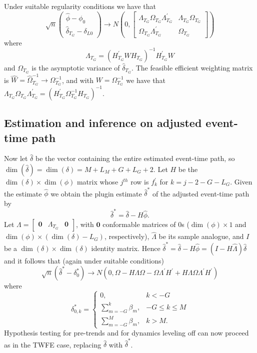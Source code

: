 \documentclass[bib]{./sty/statapress}
\begin{document}
Under suitable regularity conditions we have that
\[
\sqrt{n}\left(\begin{array}{c}
\widehat{\phi}-\phi_{0}\\
\widehat{\delta}_{T_G}-\delta_{L0}
\end{array}\right)\to N\left(0,\begin{bmatrix}\Lambda_{T_G}\Omega_{T_G}\Lambda_{T_G}^{\prime} & \Lambda_{T_G}\Omega_{T_G}\\
\Omega_{T_G}\Lambda_{T_G}^{\prime} & \Omega_{T_G}
\end{bmatrix}\right)
\]
where
\[
\Lambda_{T_G}=(H_{T_G}^{\prime}WH_{T_G})^{-1}H_{T_G}^{\prime}W
\]
and $\Omega_{T_G}$ is the asymptotic variance of $\widehat{\delta}_{T_G}$.
The feasible efficient weighting matrix is $\widehat{W}=\widehat{\Omega}_{T_G}^{-1}\to\Omega_{T_G}^{-1}$,
and with $W=\Omega_{T_G}^{-1}$ we have that $\Lambda_{T_G}\Omega_{T_G}\Lambda_{T_G}^{\prime}=(H_{T_G}^{\prime}\Omega_{T_G}^{-1}H_{T_G})^{-1}.$

\subsection{Estimation and inference on adjusted event-time path}

Now let $\hat{\delta}$ be the vector containing the entire estimated
event-time path, so $\dim\left(\hat{\delta}\right)=\dim\left(\delta\right)=M+L_{M}+G+L_{G}+2$.
Let $H$ be the $\dim\left(\delta\right)\times\dim\left(\phi\right)$
matrix whose $j^{th}$ row is $f_{k}^{'}$ for $k=j-2-G-L_{G}$. Given
the estimate $\widehat{\phi}$ we obtain the plugin estimate $\hat{\delta}^{*}$
of the adjusted event-time path by
\[
\hat{\delta}^{*}=\widehat{\delta}-H\hat{\phi}.
\]
Let $\Lambda=\begin{bmatrix}\boldsymbol{0} & \Lambda_{T_G} & \boldsymbol{0}\end{bmatrix}$,
with $\boldsymbol{0}$ conformable matrices of 0s ($\dim\left(\phi\right)\times1$
and $\dim\left(\phi\right)\times\left(\dim\left(\delta\right)-L_{G}\right)$,
respectively), $\widehat{\Lambda}$ be its sample analogue, and $I$
be a $\dim\left(\delta\right)\times\dim\left(\delta\right)$ identity
matrix. Hence $\hat{\delta}^{*}=\widehat{\delta}-H\hat{\phi}=\left(I-H\widehat{\Lambda}\right)\widehat{\delta}$
and it follows that (again under suitable conditions)
\[
\sqrt{n}\left(\widehat{\delta}^{*}-\delta_{0}^{*}\right)\to N\left(0,\Omega-H\Lambda\Omega-\Omega\Lambda^{\prime}H^{\prime}+H\Lambda\Omega\Lambda^{\prime}H^{\prime}\right)
\]
where
\[
\delta_{0,k}^{*}=\begin{cases}
0, & k<-G\\
\sum_{m=-G}^{k}\beta_{m}, & -G\le k\le M\\
\sum_{m=-G}^{M}\beta_{m}, & k>M.
\end{cases}
\]
Hypothesis testing for pre-trends and for dynamics leveling off can
now proceed as in the TWFE case, replacing $\widehat{\delta}$ with
$\hat{\delta}^{*}$.
\end{document}
